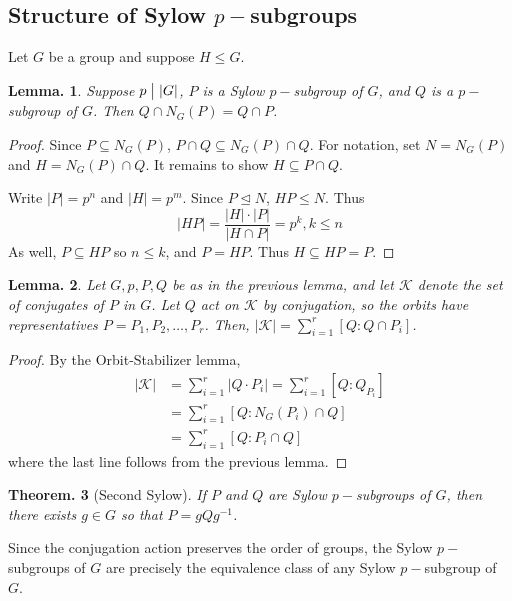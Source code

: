 \documentclass[11pt, a4paper]{memoir}
\renewcommand{\div}{\bigm|}
\theoremstyle{change}
\newtheorem{theorem}{Theorem.}[section]
\newtheorem{lemma}[theorem]{Lemma.}
\theoremstyle{plain}
\theoremstyle{nonumberplain}
\newtheorem{proof}{Proof}
\numberwithin{equation}{section}
\begin{document}
\subsection{Structure of Sylow $p-$subgroups}
Let $G$ be a group and suppose $H\leq G$.
\begin{lemma}
    Suppose $p\div|G|$, $P$ is a Sylow $p-$subgroup of $G$, and $Q$ is a $p-$subgroup of $G$.
    Then $Q\cap N_G(P)=Q\cap P$.
\end{lemma}
\begin{proof}
    Since $P\subseteq N_G(P)$, $P\cap Q\subseteq N_G(P)\cap Q$.
    For notation, set $N=N_G(P)$ and $H=N_G(P)\cap Q$.
    It remains to show $H\subseteq P\cap Q$.

    Write $|P|=p^n$ and $|H|=p^m$.
    Since $P\trianglelefteq N$, $HP\leq N$.
    Thus
    \begin{equation*}|HP|=\frac{|H|\cdot|P|}{|H\cap P|}=p^k,k\leq n\end{equation*}
    As well, $P\subseteq HP$ so $n\leq k$, and $P=HP$.
    Thus $H\subseteq HP=P$.
\end{proof}
\begin{lemma}
    Let $G,p,P,Q$ be as in the previous lemma, and let $\mathcal{K}$ denote the set of conjugates of $P$ in $G$.
    Let $Q$ act on $\mathcal{K}$ by conjugation, so the orbits have representatives $P=P_1,P_2,\ldots,P_r$.
    Then, $|\mathcal{K}|=\sum_{i=1}^r[Q:Q\cap P_i]$.
\end{lemma}
\begin{proof}
    By the Orbit-Stabilizer lemma,
    \begin{align*}
        |\mathcal{K}| &= \sum_{i=1}^r|Q\cdot P_i| = \sum\limits_{i=1}^r[Q:Q_{P_i}]\\
                      &= \sum\limits_{i=1}^r[Q:N_G(P_i)\cap Q]\\
                      &= \sum\limits_{i=1}^r[Q:P_i\cap Q]
    \end{align*}
    where the last line follows from the previous lemma.
\end{proof}
\begin{theorem}[Second Sylow]
    If $P$ and $Q$ are Sylow $p-$subgroups of $G$, then there exists $g\in G$ so that $P=gQg^{-1}$.
\end{theorem}
Since the conjugation action preserves the order of groups, the Sylow $p-$subgroups of $G$ are precisely the equivalence class of any Sylow $p-$subgroup of $G$.
\end{document}
